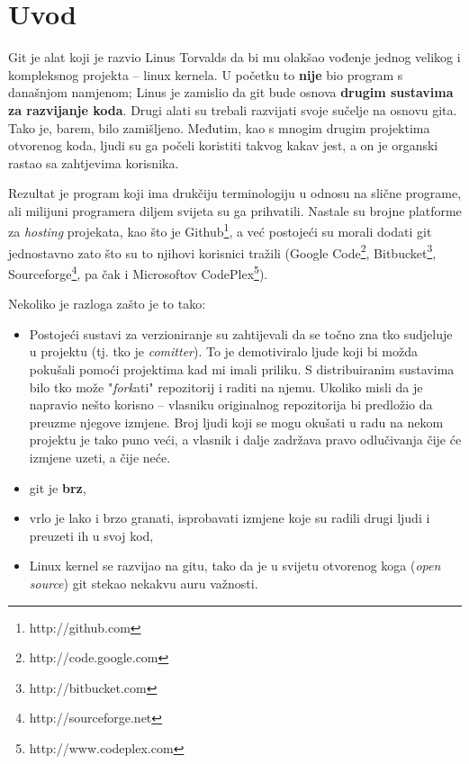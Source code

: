 \chapter*{Uvod}

Git je alat koji je razvio Linus Torvalds da bi mu olakšao vođenje jednog velikog i kompleksnog projekta -- linux kernela.
U početku to \textbf{nije} bio program s današnjom namjenom; Linus je zamislio da git bude osnova \textbf{drugim sustavima za razvijanje koda}.
Drugi alati su trebali razvijati svoje sučelje na osnovu gita.
Tako je, barem, bilo zamišljeno.
Međutim, kao s mnogim drugim projektima otvorenog koda, ljudi su ga počeli koristiti takvog kakav jest, a on je organski rastao sa zahtjevima korisnika.

Rezultat je program koji ima drukčiju terminologiju u odnosu na slične programe, ali milijuni programera diljem svijeta su ga prihvatili. 
Nastale su brojne platforme za \emph{hosting} projekata, kao što je Github\footnote{http://github.com}, a već postojeći su morali dodati git jednostavno zato što su to njihovi korisnici tražili (Google Code\footnote{http://code.google.com}, Bitbucket\footnote{http://bitbucket.com}, Sourceforge\footnote{http://sourceforge.net}, pa čak i Microsoftov CodePlex\footnote{http://www.codeplex.com}).

Nekoliko je razloga zašto je to tako:

\begin{itemize}
	\item Postojeći sustavi za verzioniranje su zahtijevali da se točno zna tko sudjeluje u projektu (tj. tko je \emph{comitter}).%
    To je demotiviralo ljude koji bi možda pokušali pomoći projektima kad mi imali priliku.%
    S distribuiranim sustavima bilo tko može "\emph{fork}ati" repozitorij i raditi na njemu.%
    Ukoliko misli da je napravio nešto korisno -- vlasniku originalnog repozitorija bi predložio da preuzme njegove izmjene.%
    Broj ljudi koji se mogu okušati u radu na nekom projektu je tako puno veći, a vlasnik i dalje zadržava pravo odlučivanja čije će izmjene uzeti, a čije neće.
	\item git je \textbf{brz},
	\item vrlo je lako i brzo granati, isprobavati izmjene koje su radili drugi ljudi i preuzeti ih u svoj kod,
	\item Linux kernel se razvijao na gitu, tako da je u svijetu otvorenog koga (\emph{open source}) git stekao nekakvu auru važnosti.
\end{itemize}

